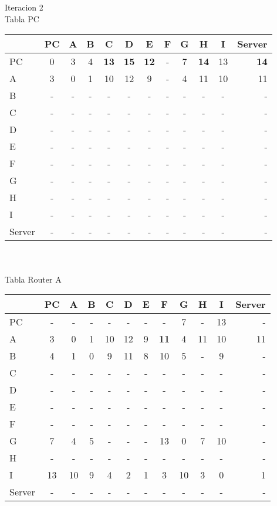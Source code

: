\documentclass{article}
\begin{document}
\\
\\
Iteracion 2
\\
Tabla PC\\
\begin{tabular}{l*{10}{c}r}
              & PC & A & B & C & D & E & F  & G & H & I & Server \\
\hline
PC             & 0 & 3 & 4 &\bf{13}&\bf{15}&\bf{12}& - & 7 &\bf{14}& 13 &\bf{14}\\
A              & 3 & 0 & 1 & 10 & 12 & 9 & - & 4 & 11 & 10 & 11 \\
B              & - & - & - & - & - & - & - & - & - & - & - \\
C              & - & - & - & - & - & - & - & - & - & - & - \\
D              & - & - & - & - & - & - & - & - & - & - & - \\
E              & - & - & - & - & - & - & - & - & - & - & - \\
F              & - & - & - & - & - & - & - & - & - & - & - \\
G              & - & - & - & - & - & - & - & - & - & - & - \\
H              & - & - & - & - & - & - & - & - & - & - & - \\
I              & - & - & - & - & - & - & - & - & - & - & - \\
Server         & - & - & - & - & - & - & - & - & - & - & - \\	

\end{tabular}
\\
\\
Tabla Router A  \\
\begin{tabular}{l*{10}{c}r}
              & PC & A & B & C & D & E & F & G & H & I & Server \\
\hline
PC             & - & - & - & - & - & - & - & 7 & - & 13 & -\\
A              & 3 & 0 & 1 & 10 & 12 & 9 &\bf{11}& 4 & 11 & 10 & 11 \\
B              & 4 & 1 & 0 & 9 & 11	& 8 & 10 & 5 & - & 9 & -\\
C              & - & - & - & - & - & - & - & - & - & - & -\\
D              & - & - & - & - & - & - & - & - & - & - & -\\
E              & - & - & - & - & - & - & - & - & - & - & -\\
F              & - & - & - & - & - & - & - & - & - & - & -\\
G              & 7 & 4 & 5 & - & - & - & 13 & 0 & 7 & 10 & -\\
H              & - & - & - & - & - & - & - & - & - & - & -\\
I              & 13 & 10 & 9 & 4 & 2 & 1 & 3 & 10 & 3 & 0 & 1\\
Server         & - & - & - & - & - & - & - & - & - & - & -\\

\end{tabular}
\end{document}
